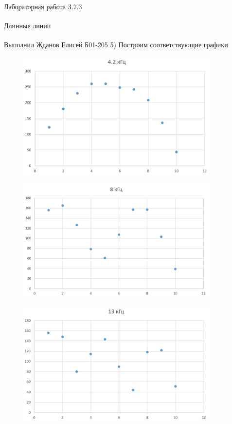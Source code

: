 \documentclass{astroedu-lab}
\begin{document}
\begin{problem}{\huge Лабораторная работа 3.7.3\\\\Длинные линии\\\\Выполнил Жданов Елисей Б01-205}
5) Построим соответствующие графики

\newpage

\begin{figure}[!h]
	\centering
	\includegraphics[width=0.9\textwidth]{1.png}
	\label{fig:boiler}
\end{figure}

\begin{figure}[!h]
	\centering
	\includegraphics[width=0.9\textwidth]{2.png}
	\label{fig:boiler}
\end{figure}

\newpage

\begin{figure}[!h]
	\centering
	\includegraphics[width=0.9\textwidth]{3.png}
	\label{fig:boiler}
\end{figure}


\end{problem}
\end{document}
